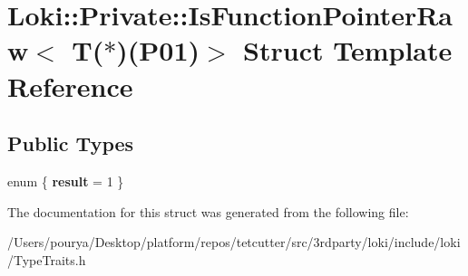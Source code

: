 \hypertarget{structLoki_1_1Private_1_1IsFunctionPointerRaw_3_01T_07_5_08_07P01_08_4}{}\section{Loki\+:\+:Private\+:\+:Is\+Function\+Pointer\+Raw$<$ T($\ast$)(P01)$>$ Struct Template Reference}
\label{structLoki_1_1Private_1_1IsFunctionPointerRaw_3_01T_07_5_08_07P01_08_4}
\subsection*{Public Types}
\begin{DoxyCompactItemize}
\item 
\hypertarget{structLoki_1_1Private_1_1IsFunctionPointerRaw_3_01T_07_5_08_07P01_08_4_a547080d6124d682497ccdc671d0bd14e}{}enum \{ {\bfseries result} = 1
 \}\label{structLoki_1_1Private_1_1IsFunctionPointerRaw_3_01T_07_5_08_07P01_08_4_a547080d6124d682497ccdc671d0bd14e}

\end{DoxyCompactItemize}


The documentation for this struct was generated from the following file\+:\begin{DoxyCompactItemize}
\item 
/\+Users/pourya/\+Desktop/platform/repos/tetcutter/src/3rdparty/loki/include/loki/Type\+Traits.\+h\end{DoxyCompactItemize}

